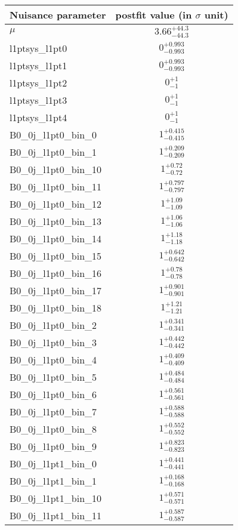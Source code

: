 
\begin{tabular}{|l|c|}
\hline
Nuisance parameter & postfit value (in $\sigma$ unit) \\\hline
$\mu$ & $3.66^{+44.3}_{-44.3}$ \\
l1ptsys\_l1pt0 & $0^{+0.993}_{-0.993}$ \\
l1ptsys\_l1pt1 & $0^{+0.993}_{-0.993}$ \\
l1ptsys\_l1pt2 & $0^{+1}_{-1}$ \\
l1ptsys\_l1pt3 & $0^{+1}_{-1}$ \\
l1ptsys\_l1pt4 & $0^{+1}_{-1}$ \\
B0\_0j\_l1pt0\_bin\_0 & $1^{+0.415}_{-0.415}$ \\
B0\_0j\_l1pt0\_bin\_1 & $1^{+0.209}_{-0.209}$ \\
B0\_0j\_l1pt0\_bin\_10 & $1^{+0.72}_{-0.72}$ \\
B0\_0j\_l1pt0\_bin\_11 & $1^{+0.797}_{-0.797}$ \\
B0\_0j\_l1pt0\_bin\_12 & $1^{+1.09}_{-1.09}$ \\
B0\_0j\_l1pt0\_bin\_13 & $1^{+1.06}_{-1.06}$ \\
B0\_0j\_l1pt0\_bin\_14 & $1^{+1.18}_{-1.18}$ \\
B0\_0j\_l1pt0\_bin\_15 & $1^{+0.642}_{-0.642}$ \\
B0\_0j\_l1pt0\_bin\_16 & $1^{+0.78}_{-0.78}$ \\
B0\_0j\_l1pt0\_bin\_17 & $1^{+0.901}_{-0.901}$ \\
B0\_0j\_l1pt0\_bin\_18 & $1^{+1.21}_{-1.21}$ \\
B0\_0j\_l1pt0\_bin\_2 & $1^{+0.341}_{-0.341}$ \\
B0\_0j\_l1pt0\_bin\_3 & $1^{+0.442}_{-0.442}$ \\
B0\_0j\_l1pt0\_bin\_4 & $1^{+0.409}_{-0.409}$ \\
B0\_0j\_l1pt0\_bin\_5 & $1^{+0.484}_{-0.484}$ \\
B0\_0j\_l1pt0\_bin\_6 & $1^{+0.561}_{-0.561}$ \\
B0\_0j\_l1pt0\_bin\_7 & $1^{+0.588}_{-0.588}$ \\
B0\_0j\_l1pt0\_bin\_8 & $1^{+0.552}_{-0.552}$ \\
B0\_0j\_l1pt0\_bin\_9 & $1^{+0.823}_{-0.823}$ \\
B0\_0j\_l1pt1\_bin\_0 & $1^{+0.441}_{-0.441}$ \\
B0\_0j\_l1pt1\_bin\_1 & $1^{+0.168}_{-0.168}$ \\
B0\_0j\_l1pt1\_bin\_10 & $1^{+0.571}_{-0.571}$ \\
B0\_0j\_l1pt1\_bin\_11 & $1^{+0.587}_{-0.587}$ \\

\end{tabular}
